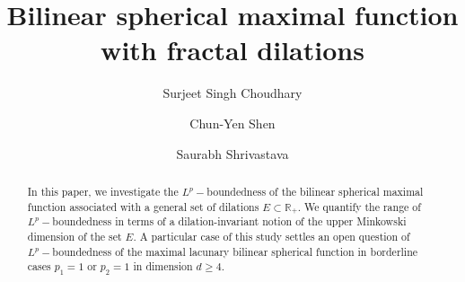 \documentclass[a4paper,reqno]{amsart}
\numberwithin{equation}{section}
\newcommand{\R}{{\mathbb {R}}}
\begin{document}
	\title{Bilinear spherical maximal function with fractal dilations}
	
	\author[S.S. Choudhary]{Surjeet Singh Choudhary}
	\address{Surjeet Singh Choudhary\\
		National Center for Theoretical Sciences\\
		National Taiwan University\\
		Taipei-106, Taiwan.}
	
	\author[C.Y. Shen]{Chun-Yen Shen}
	\address{Chun-Yen Shen\\
		Department of Mathematics\\
		National Taiwan University\\
		Taipei-106, Taiwan.}
	
	\author[S. Shrivastava]{Saurabh Shrivastava}
	\address{Saurabh Shrivastava\\
		Department of Mathematics\\
		Indian Institute of Science Education and Research Bhopal\\
		Bhopal-462066, India.}
	
	
	\begin{abstract}
		In this paper, we investigate the $L^p-$boundedness of the bilinear spherical maximal function associated with a general set of dilations $E\subset\R_+$. We quantify the range of $L^p-$boundedness in terms of a dilation-invariant notion of the upper Minkowski dimension of the set $E$. A particular case of this study settles an open question of $L^p-$boundedness of the maximal lacunary bilinear spherical function in borderline cases $p_1=1$ or $p_2=1$ in dimension $d\geq4$.
	\end{abstract}
	
	\maketitle
	\tableofcontents
\end{document}
